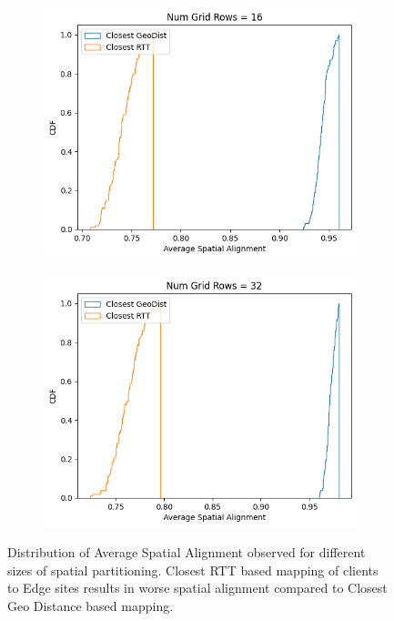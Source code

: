 \begin{figure}
\begin{subfigure}{0.45\textwidth}
  \centering
  \includegraphics[width=\linewidth]{figures/mechanisms/spatial_ctx_mgmt/spatial_alignment_randomized_16_rows.png}
  \caption{}
\end{subfigure}%
\begin{subfigure}{0.45\textwidth}
  \centering
  \includegraphics[width=\linewidth]{figures/mechanisms/spatial_ctx_mgmt/spatial_alignment_randomized_32_rows.png}
  \caption{}
\end{subfigure}
\caption{Distribution of Average Spatial Alignment observed for different sizes of spatial partitioning. Closest RTT based mapping of clients to Edge sites results in worse spatial alignment compared to Closest Geo Distance based mapping.}
\label{fig:spatial_alignment_eval}
\end{figure}

